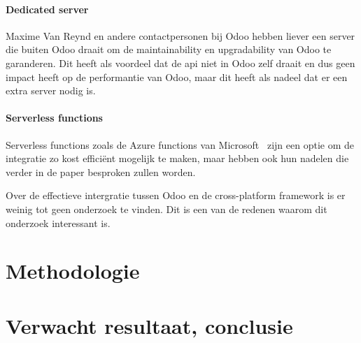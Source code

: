\paragraph*{Dedicated server}
Maxime Van Reynd en andere contactpersonen bij Odoo hebben liever een server die buiten Odoo draait om de maintainability en upgradability van Odoo te garanderen.
Dit heeft als voordeel dat de api niet in Odoo zelf draait en dus geen impact heeft op de performantie van Odoo, maar dit heeft als nadeel dat er een extra server nodig is.

\paragraph*{Serverless functions}
Serverless functions zoals de Azure functions van Microsoft~\textcite{microsoftAzureFunctions} zijn een optie om de integratie zo kost efficiënt mogelijk te maken, 
maar hebben ook hun nadelen die verder in de paper besproken zullen worden.

\bigskip

Over de effectieve intergratie tussen Odoo en de cross-platform framework is er weinig tot geen onderzoek te vinden.
Dit is een van de redenen waarom dit onderzoek interessant is.

\section{Methodologie}%
\label{sec:methodologie}






\section{Verwacht resultaat, conclusie}%
\label{sec:verwachte_resultaten}

